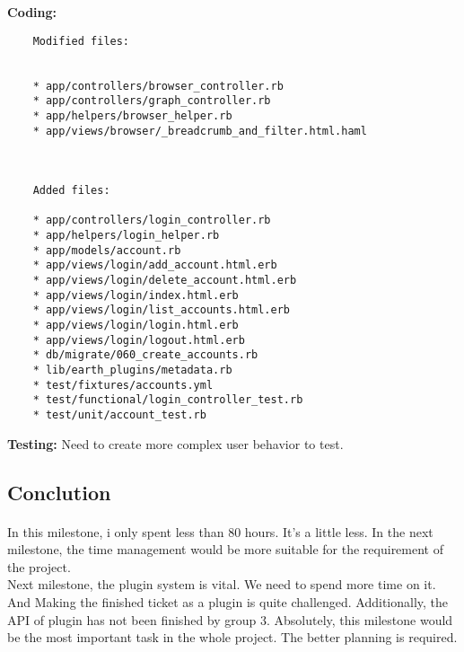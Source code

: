 \documentclass[10pt,a4,oneside]{article}
\begin{document}
\textbf{Coding:}\\
\begin{verbatim}
    Modified files: 


    * app/controllers/browser_controller.rb
    * app/controllers/graph_controller.rb
    * app/helpers/browser_helper.rb
    * app/views/browser/_breadcrumb_and_filter.html.haml



    Added files: 

    * app/controllers/login_controller.rb
    * app/helpers/login_helper.rb
    * app/models/account.rb
    * app/views/login/add_account.html.erb
    * app/views/login/delete_account.html.erb
    * app/views/login/index.html.erb
    * app/views/login/list_accounts.html.erb
    * app/views/login/login.html.erb
    * app/views/login/logout.html.erb
    * db/migrate/060_create_accounts.rb
    * lib/earth_plugins/metadata.rb
    * test/fixtures/accounts.yml
    * test/functional/login_controller_test.rb
    * test/unit/account_test.rb
\end{verbatim}
\textbf{Testing:}
Need to create more complex user behavior to test.\\
\subsection*{Conclution}

\paragraph{}
In this milestone, i only spent less than 80 hours. It's a little less. In the next milestone, the time management would be more suitable for the requirement of the project.\\

Next milestone, the plugin system is vital. We need to spend more time on it. And Making the finished ticket as a plugin is quite challenged. Additionally, the API of plugin has not been finished by group 3. Absolutely, this milestone would be the most important task in the whole project. The better planning is required.
\end{document}
